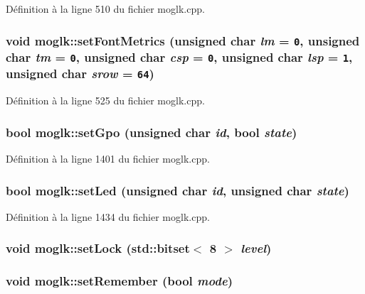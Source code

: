Définition à la ligne 510 du fichier moglk.cpp.\hypertarget{classmoglk_17c4f023df63951df9f19f08c56f8786}{
\subsubsection[{setFontMetrics}]{\setlength{\rightskip}{0pt plus 5cm}void moglk::setFontMetrics (unsigned char {\em lm} = {\tt 0}, \/  unsigned char {\em tm} = {\tt 0}, \/  unsigned char {\em csp} = {\tt 0}, \/  unsigned char {\em lsp} = {\tt 1}, \/  unsigned char {\em srow} = {\tt 64})}}
\label{classmoglk_17c4f023df63951df9f19f08c56f8786}




Définition à la ligne 525 du fichier moglk.cpp.\hypertarget{classmoglk_4acb0355df560236b463eb323a61f182}{
\subsubsection[{setGpo}]{\setlength{\rightskip}{0pt plus 5cm}bool moglk::setGpo (unsigned char {\em id}, \/  bool {\em state})}}
\label{classmoglk_4acb0355df560236b463eb323a61f182}




Définition à la ligne 1401 du fichier moglk.cpp.\hypertarget{classmoglk_7a9fe2fe9dd14ac41e4c2429a5ba1312}{
\subsubsection[{setLed}]{\setlength{\rightskip}{0pt plus 5cm}bool moglk::setLed (unsigned char {\em id}, \/  unsigned char {\em state})}}
\label{classmoglk_7a9fe2fe9dd14ac41e4c2429a5ba1312}




Définition à la ligne 1434 du fichier moglk.cpp.\hypertarget{classmoglk_a9d4351888605654a20b9d3e46160ce3}{
\subsubsection[{setLock}]{\setlength{\rightskip}{0pt plus 5cm}void moglk::setLock (std::bitset$<$ 8 $>$ {\em level})}}
\label{classmoglk_a9d4351888605654a20b9d3e46160ce3}


\hypertarget{classmoglk_a56976ce3e35fc312c11488a6c08cfdc}{
\subsubsection[{setRemember}]{\setlength{\rightskip}{0pt plus 5cm}void moglk::setRemember (bool {\em mode})}}
\label{classmoglk_a56976ce3e35fc312c11488a6c08cfdc}




